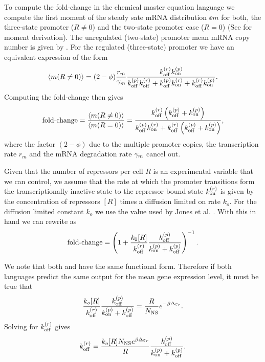 To compute the fold-change in the chemical master equation language we compute
the first moment of the steady sate mRNA distribution $\ee{m}$ for both, the
three-state promoter ($R \neq 0$) and the two-state promoter case ($R=0$) (See
 for moment derivation). The unregulated (two-state)
promoter mean mRNA copy number is given by . For
the regulated (three-state) promoter we have an equivalent expression of the
form
\begin{equation}
  \left\langle m (R \neq 0) \right\rangle = (2 - \phi){r_m \over \gamma _m} {k^{(r)}_{\text{off}}k^{(p)}_{\text{on}}
  \over k^{(p)}_{\text{off}}k^{(r)}_{\text{off}} + k^{(p)}_{\text{off}}k^{(r)}_{\text{on}} + k^{(r)}_{\text{off}}k^{(p)}_{\text{on}}}.
\end{equation}
Computing the fold-change then gives
\begin{equation}
  \text{fold-change} = {\left\langle m (R \neq 0) \right\rangle \over \left\langle m (R = 0) \right\rangle} =
  {k^{(r)}_{\text{off}} \left( k^{(p)}_{\text{off}} + k^{(p)}_{\text{on}} \right) \over
  k^{(p)}_{\text{off}}k^{(r)}_{\text{on}} + k^{(r)}_{\text{off}} \left( k^{(p)}_{\text{off}} + k^{(p)}_{\text{on}} \right)},
  \label{seq_fold_change_cme}
\end{equation}
where the factor $(2 - \phi)$ due to the multiple promoter copies, the
transcription rate $r_m$ and the mRNA degradation rate $\gamma _m$ cancel out.

Given that the number of repressors per cell $R$ is an experimental variable
that we can control, we assume that the rate at which the promoter transitions
form the transcriptionally inactive state to the repressor bound state $k^{(r)}_{\text{on}}$
is given by the concentration of repressors $[R]$ times a diffusion limited on
rate $k_o$. For the diffusion limited constant $k_o$ we use the value used by
Jones et al. \cite{Jones2014a}. With this in hand we can rewrite
 as
\begin{equation}
  \text{fold-change} = \left( 1 + {k_0 [R] \over k^{(r)}_{\text{off}}}
                {k^{(p)}_{\text{off}} \over k^{(p)}_{\text{on}} + k^{(p)}_{\text{off}}} \right)^{-1}.
  \label{seq_fc_kinetic}
\end{equation}

We note that both  and  have the same
functional form. Therefore if both languages predict the same output for the
mean gene expression level, it must be true that
\begin{equation}
  {k_o [R] \over k^{(r)}_{\text{off}}}{k^{(p)}_{\text{off}}\over k^{(p)}_{\text{on}}+ k^{(p)}_{\text{off}}} =
  {R \over N_\text{NS}} e^{-\beta\Delta\varepsilon_r}.
\end{equation}
Solving for $k^{(r)}_{\text{off}}$ gives
\begin{equation}
  k^{(r)}_{\text{off}} = {k_o [R] N_\text{NS} e^{\beta\Delta\varepsilon_r} \over R}{k^{(p)}_{\text{off}} \over k^{(p)}_{\text{on}} + k^{(p)}_{\text{off}}}.
  \label{seq_kroff_complete}
\end{equation}


